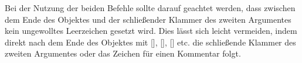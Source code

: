 \documentclass[%
  english,ngerman,%
  cdgeometry=no,DIV=12,%
  cd=false,cdfont=false,cdtitle=true,%
  headings=normal,%
  automark,%
  listof=toc,%
]{tudscrartcl}
\begin{document}
Bei der Nutzung der beiden Befehle sollte darauf geachtet werden, dass zwischen 
dem Ende des Objektes und der schließender Klammer des zweiten Argumentes kein 
ungewolltes Leerzeichen gesetzt wird. Dies lässt sich leicht vermeiden, indem 
direkt nach dem Ende des Objektes mit [], 
[], [] etc. die 
schließende Klammer des zweiten Argumentes oder das Zeichen für einen Kommentar 
\PValue{\%} folgt.

\begin{table}
\end{table}
\end{document}
